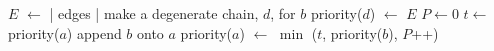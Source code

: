 \begin{algorithmic}
    \State $E$ $\gets$ | edges |
    \State make a degenerate chain, $d$, for $b$
    \State priority($d$) $\gets$ $E$
    \EndFor
    \State $P \gets 0$
    \State $ t \gets $ priority($a$)
    \State append $b$ onto $a$
    \State priority($a$) $\gets$ $\min$ ($t$, priority($b$), $P$++)
    \EndFor
\end{algorithmic}